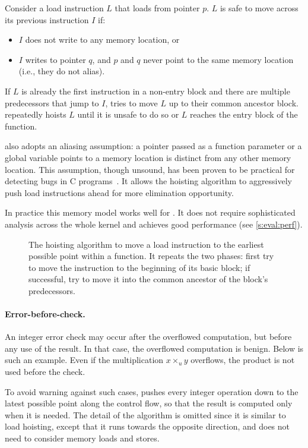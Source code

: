 Consider a load instruction $L$ that loads from pointer $p$.  $L$ is
safe to move across its previous instruction $I$ if:
\begin{itemize}
\item $I$ does not write to any memory location, or
\item $I$ writes to pointer $q$, and $p$ and $q$ never point to the
same memory location (i.e., they do not alias).
\end{itemize}

If $L$ is already the first instruction in a non-entry block and
there are multiple predecessors that jump to $I$, \sys tries to
move $L$ up to their common ancestor block.  \sys repeatedly hoists $L$
until it is unsafe to do so or $L$ reaches the entry block of the
function.

\sys also adopts an aliasing assumption: a pointer passed as a
function parameter or a global variable points to a memory location
is distinct from any other memory location.  This assumption, though
unsound, has been proven to be practical for detecting bugs in C
programs~\cite{livshits:ipssa}.  It allows the hoisting algorithm
to aggressively push load instructions ahead for more elimination
opportunity.

In practice this memory model works well for \sys.
It does not require sophisticated analysis across the whole kernel
and achieves good performance (see \autoref{s:eval:perf}).

\begin{figure}

\caption{The hoisting algorithm to move a load instruction to the
earliest possible point within a function.  It repeats the two
phases: first try to move the instruction to the beginning of its
basic block; if successful, try to move it into the common ancestor
of the block's predecessors.}
\label{f:hoist}
\end{figure}
\fi

\paragraph{Error-before-check.}
An integer error check may occur after the overflowed computation,
but before any use of the result.  In that case, the overflowed
computation is benign.  Below is such an example.  Even if the
multiplication $x \times_u y$ overflows, the product  is
not used before the check.


To avoid warning against such cases, \sys pushes every
integer operation down to the latest possible point along the control
flow, so that the result is computed only when it is needed.  The
detail of the algorithm is omitted since it is similar to load
hoisting, except that it runs towards the opposite direction, and
does not need to consider memory loads and stores.

